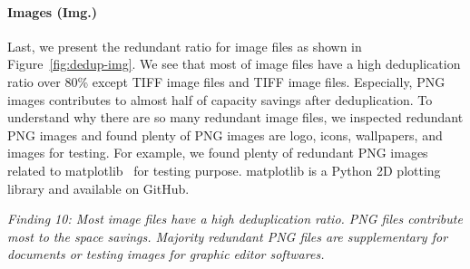 \paragraph{Images (Img.)}

Last, we present the redundant ratio for image files as shown in Figure~\ref{fig:dedup-img}.
We see that most of image files have a high deduplication ratio over 80\% except TIFF image files and TIFF image files. Especially, PNG images contributes to almost half of capacity savings after deduplication.
To understand why there are so many redundant image files, we inspected redundant PNG images and found plenty of PNG images are logo, icons, wallpapers, and images for testing. 
For example, we found plenty of redundant PNG images related to matplotlib~\cite{xxx} for testing purpose. matplotlib is a Python 2D plotting library and available on GitHub.

\textit{Finding 10: Most image files have a high deduplication ratio. PNG files contribute most to the space savings. Majority redundant PNG files are supplementary for documents or testing images for graphic editor softwares.}
%



